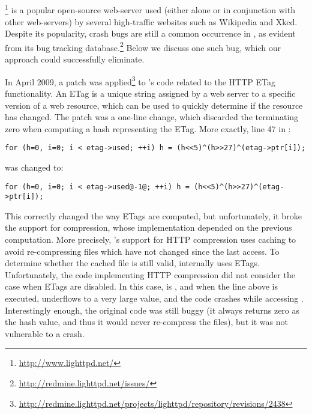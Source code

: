 \subsection{\lighttpd}

\lighttpd\footnote{\url{http://www.lighttpd.net/}} is a popular open-source 
web-server used (either alone or in conjunction with other web-servers)
by several high-traffic websites such as Wikipedia and Xkcd.
Despite its popularity, crash bugs are still a common
occurrence in \lighttpd, as evident from its bug tracking
database.\footnote{\url{http://redmine.lighttpd.net/issues/}}  Below
we discuss one such bug, which our approach could successfully
eliminate.

In April 2009, a patch was
applied\footnote{\url{http://redmine.lighttpd.net/projects/lighttpd/repository/revisions/2438}}
to \lighttpd's code related to the HTTP ETag functionality.  An ETag
is a unique string assigned by a web server to a specific version of a
web resource, which can be used to quickly determine if the resource
has changed.  The patch was a one-line change, which discarded the
terminating zero when computing a hash representing the ETag.  More
exactly, line 47 in :

\begin{lstlisting}[numbers=none,breaklines=true,xleftmargin=0pt]
for (h=0, i=0; i < etag->used; ++i) h = (h<<5)^(h>>27)^(etag->ptr[i]);
\end{lstlisting}
\noindent was changed to:
\begin{lstlisting}[numbers=none,breaklines=true,xleftmargin=0pt]
for (h=0, i=0; i < etag->used@-1@; ++i) h = (h<<5)^(h>>27)^(etag->ptr[i]);
\end{lstlisting}

This correctly changed the way ETags are computed, but unfortunately,
it broke the support for compression, whose implementation depended on
the previous computation.  More precisely, \lighttpd's support for HTTP
compression uses caching to avoid re-compressing files which have not
changed since the last access.  To determine whether the cached
file is still valid, \lighttpd internally uses ETags.  Unfortunately,
the code implementing HTTP compression did not consider the case when
ETags are disabled.  In this case, 
is , and when the line above is
executed,  underflows to a very large value, and
the code crashes while accessing .
Interestingly enough, the original code was still buggy (it always
returns zero as the hash value, and thus it would never re-compress
the files), but it was not vulnerable to a crash.

